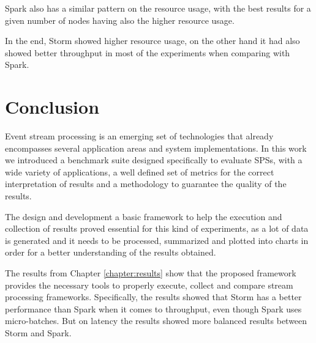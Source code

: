 \documentclass[ppgc,diss,english]{iiufrgs}
\begin{document}
Spark also has a similar pattern on the resource usage, with the best results for a given number of nodes having also the higher resource usage.

In the end, Storm showed higher resource usage, on the other hand it had also showed better throughput in most of the experiments when comparing with Spark.








\chapter{Conclusion}
\label{chapter:conclusion}

Event stream processing is an emerging set of technologies that already encompasses several application areas and system implementations. In this work we introduced a benchmark suite designed specifically to evaluate SPSs, with a wide variety of applications, a well defined set of metrics for the correct interpretation of results and a methodology to guarantee the quality of the results.

The design and development a basic framework to help the execution and collection of results proved essential for this kind of experiments, as a lot of data is generated and it needs to be processed, summarized and plotted into charts in order for a better understanding of the results obtained.

The results from Chapter \ref{chapter:results} show that the proposed framework provides the necessary tools to properly execute, collect and compare stream processing frameworks. Specifically, the results showed that Storm has a better performance than Spark when it comes to throughput, even though Spark uses micro-batches. But on latency the results showed more balanced results between Storm and Spark.
\end{document}
